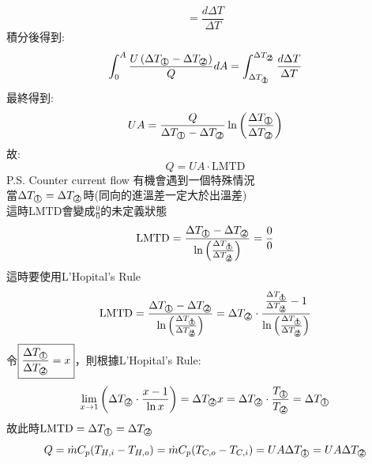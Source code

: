 \documentclass[../main.tex]{subfiles}
\begin{document}
\begin{itemize}
\begin{enumerate}
\begin{equation}
    = \frac{d\Delta T}{\Delta T}
    \end{equation}
    積分後得到:
    \begin{equation}
      \int_0^A \frac{U\left(\Delta T_{\mcirc{\raisebox{-0.5pt}{1}}} - \Delta T_{\mcirc{\raisebox{-0.5pt}{2}}}\right)}{Q} dA 
      = \int_{\Delta T_{\mcirc{\raisebox{-0.5pt}{1}}}}^{\Delta T_{\mcirc{\raisebox{-0.5pt}{2}}}} \frac{d\Delta T}{\Delta T}
    \end{equation}
    最終得到:
    \begin{equation}
      U A = \frac{Q}{\Delta T_{\mcirc{\raisebox{-0.5pt}{1}}} - \Delta T_{\mcirc{\raisebox{-0.5pt}{2}}}} \ln\left(\frac{\Delta T_{\mcirc{\raisebox{-0.5pt}{1}}}}{\Delta T_{\mcirc{\raisebox{-0.5pt}{2}}}}\right)
    \end{equation}
    故:
    \begin{equation}
      Q = U A \cdot \text{LMTD}
    \end{equation}
    P.S. Counter current flow 有機會遇到一個特殊情況\\
    當$\Delta T_{\text{\textcircled{\footnotesize 1}}} = \Delta T_{\text{\textcircled{\footnotesize 2}}}$時(同向的進溫差一定大於出溫差)\\
    這時$\text{LMTD}$會變成$\frac{0}{0}$的未定義狀態
    \begin{equation}
      \text{LMTD} = \frac{\Delta T_{\text{\textcircled{\footnotesize 1}}}-\Delta T_{\text{\textcircled{\footnotesize 2}}}}
      {\ln\left(\frac{\Delta T_{\text{\textcircled{\footnotesize 1}}}}{\Delta T_{\text{\textcircled{\footnotesize 2}}}}\right)} = \frac{0}{0}
    \end{equation}
    這時要使用L'Hopital's Rule
    \begin{equation}
      \text{LMTD} = \frac{\Delta T_{\text{\textcircled{\footnotesize 1}}}-\Delta T_{\text{\textcircled{\footnotesize 2}}}}
      {\ln\left(\frac{\Delta T_{\text{\textcircled{\footnotesize 1}}}}{\Delta T_{\text{\textcircled{\footnotesize 2}}}}\right)} = 
      \Delta T_{\text{\textcircled{\footnotesize 2}}} \cdot \frac{\frac{\Delta T_{\text{\textcircled{\footnotesize 1}}}}{\Delta T_{\text{\textcircled{\footnotesize 2}}}}-1}{\ln\left(\frac{\Delta T_{\text{\textcircled{\footnotesize 1}}}}{\Delta T_{\text{\textcircled{\footnotesize 2}}}}\right)}
    \end{equation}
    令$\boxed{\frac{\Delta T_{\text{\textcircled{\footnotesize 1}}}}{\Delta T_{\text{\textcircled{\footnotesize 2}}}} = x}$，則根據L'Hopital's Rule:
    \begin{equation}
      \lim_{x\rightarrow 1}\left(\Delta T_{\text{\textcircled{\footnotesize 2}}}\cdot\frac{x-1}{\ln x} \right) =  \Delta T_{\text{\textcircled{\footnotesize 2}}} x = 
      \Delta T_{\text{\textcircled{\footnotesize 2}}} \cdot \frac{T_{\text{\textcircled{\footnotesize 1}}}}{T_{\text{\textcircled{\footnotesize 2}}}} = \Delta T_{\text{\textcircled{\footnotesize 1}}}
    \end{equation}
    故此時$\text{LMTD} = \Delta T_{\text{\textcircled{\footnotesize 1}}} = \Delta T_{\text{\textcircled{\footnotesize 2}}}$
    \begin{equation}
      Q = \dot m C_p (T_{H,i}-T_{H,o}) = \dot m C_p (T_{C,o}-T_{C,i}) = U A \Delta T_{\mcirc{1}} = U A \Delta T_{\mcirc{2}} \label{eq:lmtd_evaporator_lhospital}

\end{equation}
\end{enumerate}
\end{itemize}
\end{document}
